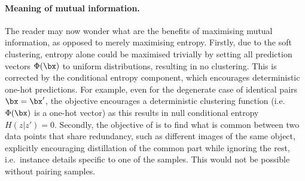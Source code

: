 \paragraph{Meaning of mutual information.}

The reader may now wonder what are the benefits of maximising mutual information, as opposed to merely maximising entropy.
Firstly, due to the soft clustering, entropy alone could be maximised trivially by setting all prediction vectors $\Phi(\bx)$ to uniform distributions, resulting in no clustering.
This is corrected by the conditional entropy component, which encourages deterministic one-hot predictions.
For example, even for the degenerate case of identical pairs $\bx = \bx'$, the \methodnameshort objective encourages a deterministic clustering function (i.e.~$\Phi(\bx)$ is a one-hot vector) as this results in null conditional entropy $H(z|z')=0$. 
Secondly, the objective of \methodnameshort is to find what is common between two data points that share redundancy, such as different images of the same object, explicitly encouraging distillation of the common part while ignoring the rest, i.e.~instance details specific to one of the samples. This would not be possible without pairing samples.



